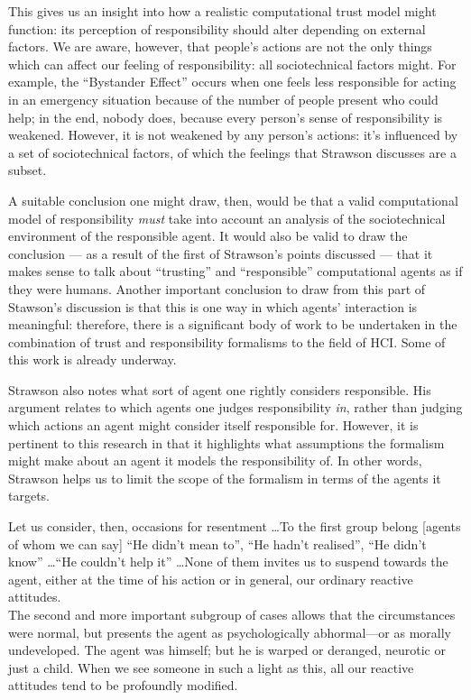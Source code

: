 This gives us an insight into how a realistic computational trust model might function: its perception of responsibility should alter depending on external factors. We are aware, however, that people's actions are not the only things which can affect our feeling of responsibility: all sociotechnical factors might. For example, the ``Bystander Effect''\cite{unresponsive_bystander} occurs when one feels less responsible for acting in an emergency situation because of the number of people present who could help; in the end, nobody does, because every person's sense of responsibility is weakened. However, it is not weakened by any person's actions: it's influenced by a set of sociotechnical factors, of which the feelings that Strawson discusses are a subset.\par

A suitable conclusion one might draw, then, would be that a valid computational model of responsibility \emph{must} take into account an analysis of the sociotechnical environment of the responsible agent. It would also be valid to draw the conclusion --- as a result of the first of Strawson's points discussed --- that it makes sense to talk about ``trusting'' and ``responsible'' computational agents as if they were humans. Another important conclusion to draw from this part of Stawson's discussion is that this is one way in which agents' interaction is meaningful: therefore, there is a significant body of work to be undertaken in the combination of trust and responsibility formalisms to the field of HCI\@. Some of this work is already underway\cite{Marsh2011, Macy2002}. \par

Strawson also notes what sort of agent one rightly considers responsible. His argument relates to which agents one judges responsibility \emph{in}, rather than judging which actions an agent might consider itself responsible for. However, it is pertinent to this research in that it highlights what assumptions the formalism might make about an agent it models the responsibility of. In other words, Strawson helps us to limit the scope of the formalism in terms of the agents it targets.\par

\begin{displayquote}
    Let us consider, then, occasions for resentment \ldots{}To the first group belong [agents of whom we can say] ``He didn't mean to'', ``He hadn't realised'', ``He didn't know'' \ldots{}``He couldn't help it'' \ldots{}None of them invites us to suspend towards the agent, either at the time of his action or in general, our ordinary reactive attitudes.\\
    The second and more important subgroup of cases allows that the circumstances were normal, but presents the agent as psychologically abhormal—or as morally undeveloped. The agent was himself; but he is warped or deranged, neurotic or just a child. When we see someone in such a light as this, all our reactive attitudes tend to be profoundly modified.\\
\end{displayquote}\cite{strawson}

